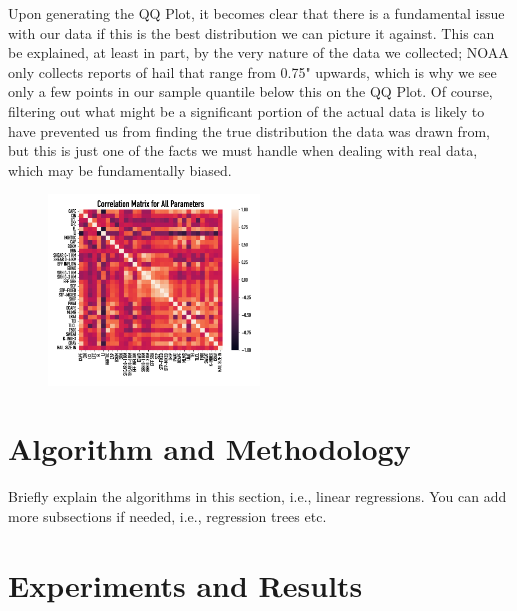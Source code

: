 \documentclass[fleqn,10pt]{SelfArx} %
\begin{document}
Upon generating the QQ Plot, it becomes clear that there is a fundamental issue with our data if this is the best distribution we can picture it against. This can be explained, at least in part, by the very nature of the data we collected; NOAA only collects reports of hail that range from 0.75" upwards, which is why we see only a few points in our sample quantile below this on the QQ Plot. Of course, filtering out what might be a significant portion of the actual data is likely to have prevented us from finding the true distribution the data was drawn from, but this is just one of the facts we must handle when dealing with real data, which may be fundamentally biased.

\begin{figure}[H]
\includegraphics[width=0.5\textwidth, center=8.5cm]{"plots/all_corrs.png"} 
\end{figure}


\bigskip
\bigskip


\section{Algorithm and Methodology}

Briefly explain the algorithms in this section, i.e., linear regressions. You can add more subsections if needed, i.e., regression trees etc.


\bigskip
\bigskip
\section{Experiments and Results}
\end{document}
